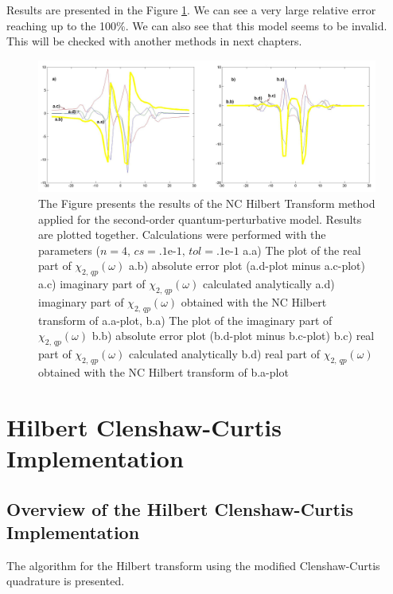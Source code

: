 \documentclass[12pt,twoside,a4paper]{article}
\numberwithin{equation}{subsection}
\numberwithin{figure}{subsection}
\begin{document}
Results are presented in the Figure \ref{fig:nc_quantum2}. We can see a very large relative error reaching up to the 100\%. We can also see
that this model seems to be invalid. This will be checked with another methods in next chapters.

\begin{figure} 
  \includegraphics[width=150mm]{img/nc_quantum2.png}
  \caption{The Figure presents the results of the NC Hilbert Transform method applied for the second-order
  quantum-perturbative model. Results are plotted together. Calculations were performed with the parameters ($n=4, \,cs=\mbox{.1e-1},
  \,tol=\mbox{.1e-1}$ a.a) The plot of the real part of ${\chi_{2, \,qp}}(\omega )$
     a.b) absolute error plot (a.d-plot minus a.c-plot) 
     a.c) imaginary part of ${\chi_{2, \,qp}}(\omega )$ calculated analytically 
     a.d) imaginary part of ${\chi_{2, \,qp}}(\omega )$ obtained with the NC Hilbert transform of a.a-plot, 
     b.a) The plot of the imaginary part of ${\chi_{2, \,qp}}(\omega )$ 
     b.b) absolute error plot (b.d-plot minus b.c-plot) 
     b.c) real part of $\chi_{2, \, qp} (\omega )$ calculated analytically 
     b.d) real part of $\chi_{2, \, qp} (\omega )$ obtained with the NC Hilbert transform of b.a-plot 
     \label{fig:nc_quantum2}
     }
\end{figure}

\section{Hilbert Clenshaw-Curtis Implementation} \label{chap:hcc}

\subsection{Overview of the Hilbert Clenshaw-Curtis Implementation} \label{chap:hcc_overview}

The algorithm for the Hilbert transform using the modified Clenshaw-Curtis quadrature is presented. 
\end{document}
